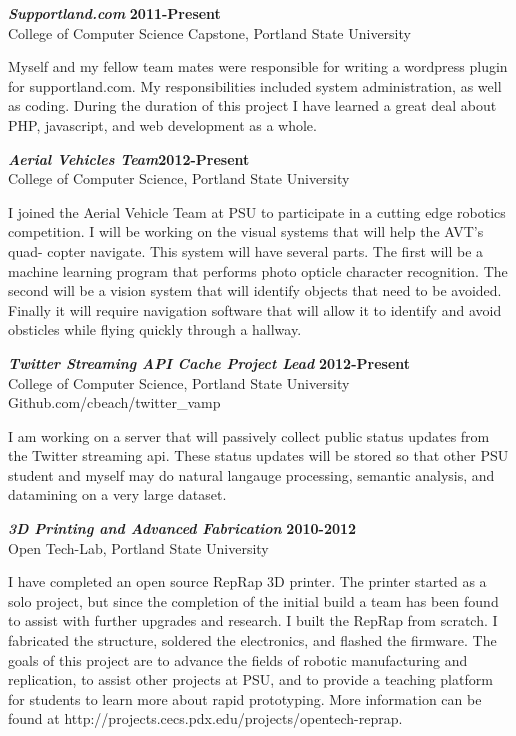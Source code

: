 \documentclass[margin]{res}
\begin{document}
\begin{resume}
				{\sl \textbf{Supportland.com}} \hfill \textbf{2011-Present} \\
                College of Computer Science Capstone, Portland State University \hfill
				
				Myself and my fellow team mates were responsible for writing a wordpress plugin 
				for supportland.com.  My responsibilities included system administration, as 
				well as coding.  During the duration of this project I have learned a great
				deal about PHP, javascript, and web development as a whole.

				{\sl \textbf{Aerial Vehicles Team}}\hfill \textbf{2012-Present} \\
				College of Computer Science, Portland State University

				I joined the Aerial Vehicle Team at PSU to participate in a cutting edge robotics
				competition.  I will be working on the visual systems that will help the AVT's quad-
				copter navigate.  This system will have several parts.  The first will be a machine
				learning program that performs photo opticle character recognition.  The second will
				be a vision system that will identify objects that need to be avoided.  Finally it 
				will require navigation software that will allow it to identify and avoid obsticles
				while flying quickly through a hallway.

				{\sl \textbf{Twitter Streaming API Cache Project Lead}} \hfill \textbf{2012-Present} \\
				College of Computer Science, Portland State University \\
				Github.com/cbeach/twitter\_vamp 

				I am working on a server that will passively collect public status updates from the
				Twitter streaming api.  These status updates will be stored so that other PSU student
				and myself may do natural langauge processing, semantic analysis, and datamining on
				a very large dataset.				

				{\sl \textbf{3D Printing and Advanced Fabrication}} \hfill \textbf{2010-2012} \\
                Open Tech-Lab, Portland State University
				
				I have completed an open source RepRap 3D printer. The printer started as a solo project, 
				but since the completion of the initial build a team has been found to assist with further 
				upgrades and research.  I built the RepRap from scratch.  I fabricated the structure, soldered  
				the electronics, and flashed the firmware. 	The goals of this project are to advance the 
				fields of robotic manufacturing and replication, to assist other projects at PSU, and to 
				provide a teaching platform for students to learn more about rapid prototyping. 
				More information can be found at http://projects.cecs.pdx.edu/projects/opentech-reprap. 
	

\end{resume}
\end{document}
